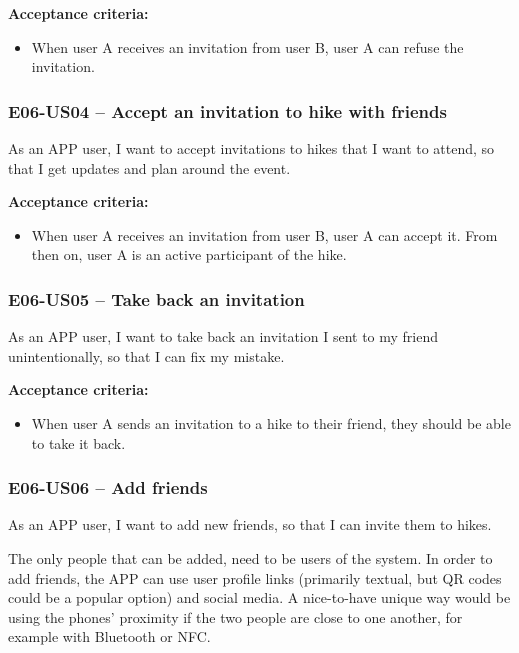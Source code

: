\textbf{Acceptance criteria:}
\begin{itemize}
    \item When user A receives an invitation from user B, user A can refuse the invitation.
\end{itemize}

\subsubsection*{E06-US04 -- Accept an invitation to hike with friends}
As an APP user, I want to accept invitations to hikes that I want to attend, so that I get updates and plan around the event.

\textbf{Acceptance criteria:}
\begin{itemize}
    \item When user A receives an invitation from user B, user A can accept it. From then on, user A is an active participant of the hike.
\end{itemize}

\subsubsection*{E06-US05 -- Take back an invitation}
As an APP user, I want to take back an invitation I sent to my friend unintentionally, so that I can fix my mistake.

\textbf{Acceptance criteria:}
\begin{itemize}
    \item When user A sends an invitation to a hike to their friend, they should be able to take it back.
\end{itemize}


\subsubsection*{E06-US06 -- Add friends}
As an APP user, I want to add new friends, so that I can invite them to hikes.

The only people that can be added, need to be users of the system.
In order to add friends, the APP can use user profile links (primarily textual, but QR codes could be a popular option) and social media.
A nice-to-have unique way would be using the phones' proximity if the two people are close to one another, for example with Bluetooth or NFC.

